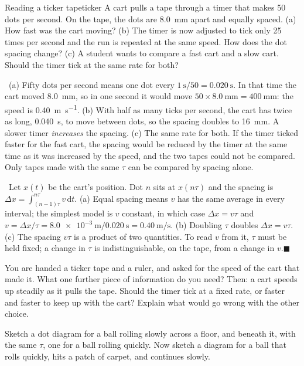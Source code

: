 \documentclass[11pt,twoside,openany]{book}
\newcommand{\dd}{\mathrm{d}}
\newcounter{check}[chapter]
\newcommand{\viewtag}[3]{\fcolorbox{#2}{#3}{\footnotesize\textbf{\textcolor{#2}{#1}}}}
\newcommand{\elemtag}{\viewtag{Elementary}{elemcol}{elempale}}
\newcommand{\calctag}{\viewtag{Calculus}{calccol}{calcpale}}
\newcommand{\elem}{\par\medskip\noindent\elemtag\ }
\newcommand{\calc}{\par\medskip\noindent\calctag\ }
\newcommand{\qed}{\hfill$\blacksquare$}
\begin{document}
\begin{example}{Reading a ticker tape}{ticker}
A cart pulls a tape through a timer that makes \num{50} dots per second. On the tape, the dots are \SI{8.0}{\milli\metre} apart and equally spaced. (a) How fast was the cart moving? (b) The timer is now adjusted to tick only \num{25} times per second and the run is repeated at the same speed. How does the dot spacing change? (c) A student wants to compare a fast cart and a slow cart. Should the timer tick at the same rate for both?

\elem (a) Fifty dots per second means one dot every $\SI{1}{\second}/50 = \SI{0.020}{\second}$. In that time the cart moved \SI{8.0}{\milli\metre}, so in one second it would move $50 \times \SI{8.0}{\milli\metre} = \SI{400}{\milli\metre}$: the speed is \SI{0.40}{\metre\per\second}. (b) With half as many ticks per second, the cart has twice as long, \SI{0.040}{\second}, to move between dots, so the spacing doubles to \SI{16}{\milli\metre}. A slower timer \emph{increases} the spacing. (c) The same rate for both. If the timer ticked faster for the fast cart, the spacing would be reduced by the timer at the same time as it was increased by the speed, and the two tapes could not be compared. Only tapes made with the same $\tau$ can be compared by spacing alone.

\calc Let $x(t)$ be the cart's position. Dot $n$ sits at $x(n\tau)$ and the spacing is $\Delta x = \int_{(n-1)\tau}^{n\tau} v\,\dd t$. (a) Equal spacing means $v$ has the same average in every interval; the simplest model is $v$ constant, in which case $\Delta x = v\tau$ and $v = \Delta x/\tau = \SI{8.0e-3}{\metre}/\SI{0.020}{\second} = \SI{0.40}{\metre\per\second}$. (b) Doubling $\tau$ doubles $\Delta x = v\tau$. (c) The spacing $v\tau$ is a product of two quantities. To read $v$ from it, $\tau$ must be held fixed; a change in $\tau$ is indistinguishable, on the tape, from a change in $v$.\qed
\end{example}

\begin{checkbox}
You are handed a ticker tape and a ruler, and asked for the speed of the cart that made it. What one further piece of information do you need? Then: a cart speeds up steadily as it pulls the tape. Should the timer tick at a fixed rate, or faster and faster to keep up with the cart? Explain what would go wrong with the other choice.
\end{checkbox}

\begin{checkbox}
Sketch a dot diagram for a ball rolling slowly across a floor, and beneath it, with the same $\tau$, one for a ball rolling quickly. Now sketch a diagram for a ball that rolls quickly, hits a patch of carpet, and continues slowly.
\end{checkbox}
\end{document}
